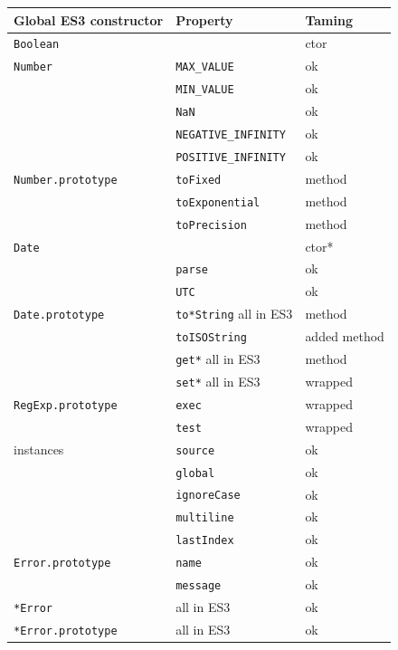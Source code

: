 \documentclass[letterpaper,twocolumn,10pt]{article}
\newcommand{\code}[1]{{\tt {#1}}}              %
\begin{document}
\begin{figure}
\begin{tabular}{lll}
  Global ES3 constructor         & Property                    & Taming \\
  \hline 
  \code{Boolean}                 &                             & ctor \\
  \hline
  \code{Number}                  & \code{MAX\_VALUE}           & ok \\
                                 & \code{MIN\_VALUE}           & ok \\
                                 & \code{NaN}                  & ok \\
                                 & \code{NEGATIVE\_INFINITY}   & ok \\
                                 & \code{POSITIVE\_INFINITY}   & ok \\
  \code{Number.prototype}        & \code{toFixed}              & method \\
                                 & \code{toExponential}        & method \\
                                 & \code{toPrecision}          & method \\
  \hline
  \code{Date}                    &                             & ctor* \\
                                 & \code{parse}                & ok \\
                                 & \code{UTC}                  & ok \\
  \code{Date.prototype}          & \code{to*String} all in ES3 & method \\
                                 & \code{toISOString}          & added method \\
                                 & \code{get*}      all in ES3 & method \\
                                 & \code{set*}      all in ES3 & wrapped \\
  \hline
  \code{RegExp.prototype}        & \code{exec}                 & wrapped \\
                                 & \code{test}                 & wrapped \\
  instances                      & \code{source}               & ok \\
                                 & \code{global}               & ok \\
                                 & \code{ignoreCase}           & ok \\
                                 & \code{multiline}            & ok \\
                                 & \code{lastIndex}            & ok \\
  \hline 
  \code{Error.prototype}         & \code{name}                 & ok \\
                                 & \code{message}              & ok \\
  \code{*Error}                  &                  all in ES3 & ok \\
  \code{*Error.prototype}        &                  all in ES3 & ok \\
  

\end{tabular}
\end{figure}
\end{document}
